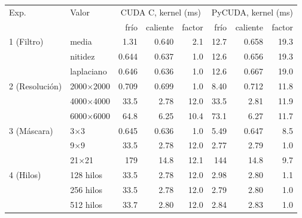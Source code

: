 \begin{tabular}{llrrrrrr}
\toprule
Exp. & Valor & \multicolumn{3}{c}{CUDA C, kernel (ms)} & \multicolumn{3}{c}{PyCUDA, kernel (ms)} \\
 & & frío & caliente & factor & frío & caliente & factor \\
\midrule
1 (Filtro) & media & 1.31 & 0.640 & 2.1 & 12.7 & 0.658 & 19.3 \\
 & nitidez & 0.644 & 0.637 & 1.0 & 12.6 & 0.656 & 19.3 \\
 & laplaciano & 0.646 & 0.636 & 1.0 & 12.6 & 0.667 & 19.0 \\
\midrule
2 (Resolución) & 2000$\times$2000 & 0.709 & 0.699 & 1.0 & 8.40 & 0.712 & 11.8 \\
 & 4000$\times$4000 & 33.5 & 2.78 & 12.0 & 33.5 & 2.81 & 11.9 \\
 & 6000$\times$6000 & 64.8 & 6.25 & 10.4 & 73.1 & 6.27 & 11.7 \\
\midrule
3 (Máscara) & 3$\times$3 & 0.645 & 0.636 & 1.0 & 5.49 & 0.647 & 8.5 \\
 & 9$\times$9 & 33.5 & 2.78 & 12.0 & 2.77 & 2.79 & 1.0 \\
 & 21$\times$21 & 179 & 14.8 & 12.1 & 144 & 14.8 & 9.7 \\
\midrule
4 (Hilos) & 128 hilos & 33.5 & 2.78 & 12.0 & 2.98 & 2.80 & 1.1 \\
 & 256 hilos & 33.5 & 2.78 & 12.0 & 2.79 & 2.80 & 1.0 \\
 & 512 hilos & 33.7 & 2.80 & 12.0 & 2.84 & 2.83 & 1.0 \\
\bottomrule
\end{tabular}
